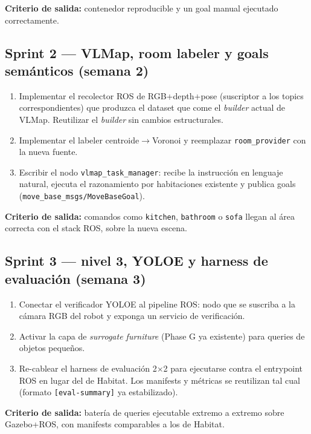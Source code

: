 \documentclass[11pt,a4paper]{article}
\begin{document}
\textbf{Criterio de salida:} contenedor reproducible y un goal manual ejecutado
correctamente.

\subsection*{Sprint 2 --- VLMap, room labeler y goals semánticos (semana 2)}
\begin{enumerate}
  \item Implementar el recolector ROS de RGB+depth+pose (suscriptor a los
        topics correspondientes) que produzca el dataset que come el
        \emph{builder} actual de VLMap. Reutilizar el \emph{builder} sin
        cambios estructurales.
  \item Implementar el labeler centroide$\rightarrow$Voronoi y reemplazar
        \texttt{room\_provider} con la nueva fuente.
  \item Escribir el nodo \texttt{vlmap\_task\_manager}: recibe la instrucción
        en lenguaje natural, ejecuta el razonamiento por habitaciones existente
        y publica goals (\texttt{move\_base\_msgs/MoveBaseGoal}).
\end{enumerate}

\textbf{Criterio de salida:} comandos como \texttt{kitchen}, \texttt{bathroom}
o \texttt{sofa} llegan al área correcta con el stack ROS, sobre la nueva escena.

\subsection*{Sprint 3 --- nivel 3, YOLOE y harness de evaluación (semana 3)}
\begin{enumerate}
  \item Conectar el verificador YOLOE al pipeline ROS: nodo que se suscriba a
        la cámara RGB del robot y exponga un servicio de verificación.
  \item Activar la capa de \emph{surrogate furniture} (Phase G ya existente)
        para queries de objetos pequeños.
  \item Re-cablear el harness de evaluación 2$\times$2 para ejecutarse contra
        el entrypoint ROS en lugar del de Habitat. Los manifests y métricas se
        reutilizan tal cual (formato \texttt{[eval-summary]} ya estabilizado).
\end{enumerate}

\textbf{Criterio de salida:} batería de queries ejecutable extremo a extremo
sobre Gazebo+ROS, con manifests comparables a los de Habitat.
\end{document}
